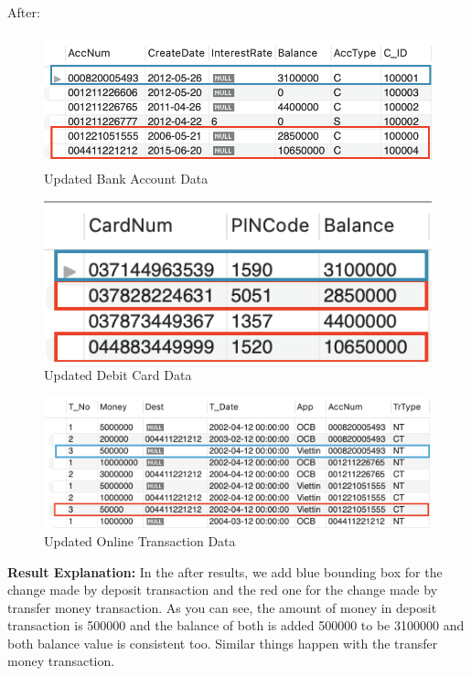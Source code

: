 \documentclass[12pt,a4paper]{article}
\begin{document}
After:
\begin{figure}[H]
    \centering
    \includegraphics[width=5.5in,height=1.5in]{Picture/AfterAccount.png}
    \caption{Updated Bank Account Data}
\end{figure}

\begin{figure}[H]
    \centering
    \includegraphics[]{Picture/AfterDebitCard.png}
    \caption{Updated Debit Card Data}
\end{figure}

\begin{figure}[H]
    \centering
    \includegraphics[width=5.5in,height=1.5in]{Picture/AfterOnlTrans.png}
    \caption{Updated Online Transaction Data}
\end{figure}

\textbf{Result Explanation: }
In the after results, we add blue bounding box for the change made by deposit transaction and the red one for the change made by transfer money transaction. As you can see, the amount of money in deposit transaction is 500000 and the balance of both is added 500000 to be 3100000 and both balance value is consistent too. Similar things happen with the transfer money transaction.
\end{document}
